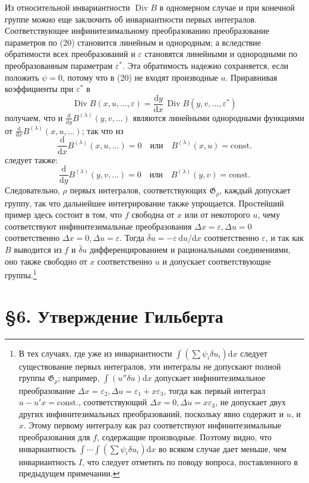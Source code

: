 \documentclass[11pt]{article}
\providecommand{\G}{\mathfrak G}
\providecommand{\eps}{\varepsilon}
\providecommand{\D}{\Delta}
\providecommand{\dd}{\mathrm d}
\DeclareMathOperator{\Div}{Div}
\providecommand{\bd}{\bar{\delta}}
\begin{document}
Из относительной инвариантности \(\Div B\) в одномерном случае и при конечной группе можно еще заключить об инвариантности первых интегралов. Соответствующее инфинитезимальному преобразованию преобразование параметров по (20) становится линейным и однородным; а вследствие обратимости всех преобразований и \(\eps\) становятся линейными и однородными по преобразованным параметрам \(\eps^*\). Эта обратимость надежно сохраняется, если положить \(\psi=0\), потому что в (20) не входят производные \(u\). Приравнивая коэффициенты при \(\eps^*\) в
\[
\Div B(x,u,\ldots,\eps)=\frac{\dd y}{\dd x}\,\Div B(y,v,\ldots,\eps^*)
\]
получаем, что и \(\frac{\dd}{\dd y}B^{(\lambda)}(y,v,\ldots)\) являются линейными однородными функциями от \(\frac{\dd}{\dd x}B^{(\lambda)}(x,u,\ldots)\); так что из
\[
\frac{\dd}{\dd x}B^{(\lambda)}(x,u,\ldots)=0
\quad\text{или}\quad B^{(\lambda)}(x,u)=\mathrm{const.}
\]
следует также:
\[
\frac{\dd}{\dd y}B^{(\lambda)}(y,v,\ldots)=0
\quad\text{или}\quad B^{(\lambda)}(y,v)=\mathrm{const.}
\]
Следовательно, \(\rho\) первых интегралов, соответствующих \(\G_\rho\), каждый допускает группу, так что дальнейшее интегрирование также упрощается. Простейший пример здесь состоит в том, что \(f\) свободна от \(x\) или от некоторого \(u\), чему соответствуют инфинитезимальные преобразования \(\D x=\eps,\D u=0\) соответственно \(\D x=0,\D u=\eps\). Тогда \(\bd u=-\eps\,\dd u/\dd x\) соответственно \(\eps\), и так как \(B\) выводится из \(f\) и \(\bd u\) дифференцированием и рациональными соединениями, оно также свободно от \(x\) соответственно \(u\) и допускает соответствующие группы.\footnote{В тех случаях, где уже из инвариантности \(\int(\sum\psi_i\delta u_i)\dd x\) следует существование первых интегралов, эти интегралы не допускают полной группы \(\G_\rho\); например, \(\int(u''\delta u)\dd x\) допускает инфинитезимальное преобразование \(\D x=\eps_2,\D u=\eps_1+x\eps_3\), тогда как первый интеграл \(u-u'x=\mathrm{const.}\), соответствующий \(\D x=0,\D u=x\eps_3\), не допускает двух других инфинитезимальных преобразований, поскольку явно содержит и \(u\), и \(x\). Этому первому интегралу как раз соответствуют инфинитезимальные преобразования для \(f\), содержащие производные. Поэтому видно, что инвариантность \(\int\!\cdots\!\int(\sum\psi_i\delta u_i)\dd x\) во всяком случае дает меньше, чем инвариантность \(I\), что следует отметить по поводу вопроса, поставленного в предыдущем примечании.}

\section*{\S{}6. Утверждение Гильберта}
\end{document}
